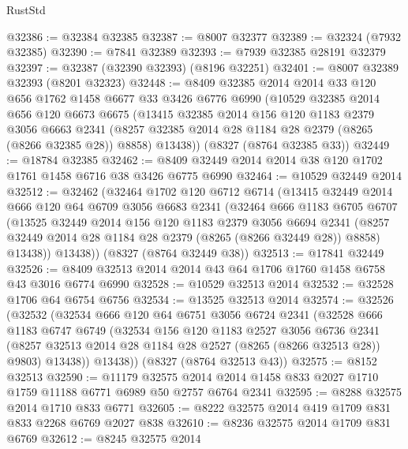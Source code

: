 \begin{lexlean}{RustStd}
\begin{coremodule}
{\begin{coremodule}
{{{{{{{{{{{{{{{{{{{{{{{{{{{{{{{{{{{{{{{{{{{{{{{{{{{{{{@32386 := @32384 @32385
@32387 := @8007 @32377
@32389 := @32324 (@7932 @32385)
@32390 := @7841 @32389
@32393 := @7939 @32385 @28191 @32379
@32397 := @32387 (@32390 @32393) (@8196 @32251)
@32401 := @8007 @32389 @32393 (@8201 @32323)
@32448 := @8409
    @32385
    @2014
    @2014
    @33
    @120
    @656
    @1762
    @1458
    @6677
    @33
    @3426
    @6776
    @6990
    (@10529
      @32385
      @2014
      @656
      @120
      @6673
      @6675
      (@13415
        @32385
        @2014
        @156
        @120
        @1183
        @2379
        @3056
        @6663
        @2341
        (@8257 @32385 @2014 @28 @1184 @28 @2379 (@8265 (@8266 @32385 @28)) @8858)
        @13438))
    (@8327 (@8764 @32385 @33))
@32449 := @18784 @32385
@32462 := @8409 @32449 @2014 @2014 @38 @120 @1702 @1761 @1458 @6716 @38 @3426 @6775 @6990
@32464 := @10529 @32449 @2014
@32512 := @32462
    (@32464
      @1702
      @120
      @6712
      @6714
      (@13415
        @32449
        @2014
        @666
        @120
        @64
        @6709
        @3056
        @6683
        @2341
        (@32464
          @666
          @1183
          @6705
          @6707
          (@13525
            @32449
            @2014
            @156
            @120
            @1183
            @2379
            @3056
            @6694
            @2341
            (@8257 @32449 @2014 @28 @1184 @28 @2379 (@8265 (@8266 @32449 @28)) @8858)
            @13438))
        @13438))
    (@8327 (@8764 @32449 @38))
@32513 := @17841 @32449
@32526 := @8409 @32513 @2014 @2014 @43 @64 @1706 @1760 @1458 @6758 @43 @3016 @6774 @6990
@32528 := @10529 @32513 @2014
@32532 := @32528 @1706 @64 @6754 @6756
@32534 := @13525 @32513 @2014
@32574 := @32526
    (@32532
      (@32534
        @666
        @120
        @64
        @6751
        @3056
        @6724
        @2341
        (@32528
          @666
          @1183
          @6747
          @6749
          (@32534
            @156
            @120
            @1183
            @2527
            @3056
            @6736
            @2341
            (@8257 @32513 @2014 @28 @1184 @28 @2527 (@8265 (@8266 @32513 @28)) @9803)
            @13438))
        @13438))
    (@8327 (@8764 @32513 @43))
@32575 := @8152 @32513
@32590 := @11179
    @32575
    @2014
    @2014
    @1458
    @833
    @2027
    @1710
    @1759
    @11188
    @6771
    @6989
    @50
    @2757
    @6764
    @2341
@32595 := @8288 @32575 @2014 @1710 @833 @6771
@32605 := @8222 @32575 @2014 @419 @1709 @831 @833 @2268 @6769 @2027 @838
@32610 := @8236 @32575 @2014 @1709 @831 @6769
@32612 := @8245 @32575 @2014
}}}}}}}}}}}}}}}}}}}}}}}}}}}}}}}}}}}}}}}}}}}}}}}}}}}}}}
\end{coremodule}}
\end{coremodule}
\end{lexlean}

